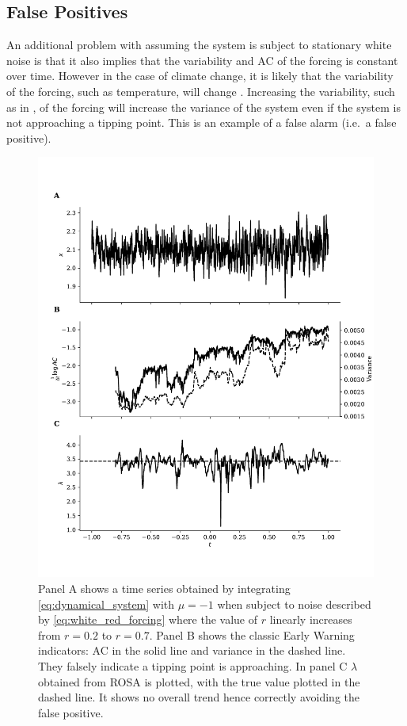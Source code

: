 \subsection{False Positives}
An additional problem with assuming the system is subject to stationary white noise is that it also implies that the
variability and AC of the forcing is constant over time. 
However in the case of 
climate change, it is likely that the variability of the forcing,
such as temperature, will change \parencite{Huntingford2013}. 
Increasing the variability, such as in \parencite{Boers2021a}, of the forcing will increase the variance of the system even
if the system is not approaching a tipping point. This is an example of a false
alarm (i.e.\ a false positive). 

\begin{figure}
\includegraphics[width=\textwidth,keepaspectratio]{figure2}
\caption[Early Warning Signal False Positive]{Panel A shows a time series obtained by integrating  \cref{eq:dynamical_system} with $\mu = -1$ when subject to
  noise described by \cref{eq:white_red_forcing} where the
  value of $r$ linearly increases from $r=0.2$ to $r=0.7$. Panel B 
  shows the classic Early Warning indicators: AC in the solid
  line and variance in the dashed line. They falsely indicate a
  tipping point is approaching. In panel C $\lambda$ obtained
  from ROSA is plotted, with the true value plotted in the dashed line. It shows
  no overall trend hence correctly avoiding the false positive.}\label{fig:changing_forcing}
\end{figure}


